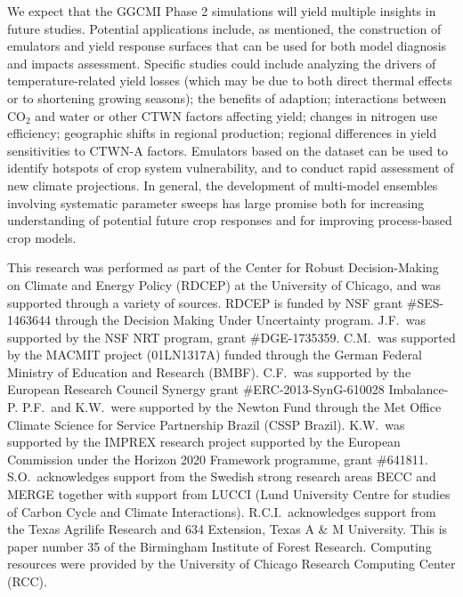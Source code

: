 \documentclass[gmd, manuscript]{copernicus} %
\begin{document}
We expect that the GGCMI Phase 2 simulations will yield multiple insights in future studies. 
Potential applications include, as mentioned, the construction of emulators and yield response surfaces that can be used for both model diagnosis and impacts assessment. Specific studies could include analyzing the drivers of temperature-related yield losses (which may be due to both direct thermal effects or to shortening growing seasons); the benefits of adaption; interactions between CO$_2$ and water or other CTWN factors affecting yield; changes in nitrogen use efficiency; geographic shifts in regional production; regional differences in yield sensitivities to CTWN-A factors. Emulators based on the dataset can be used to identify hotspots of crop system vulnerability, and to conduct rapid assessment of new climate projections.  In general, the development of multi-model ensembles involving systematic parameter sweeps has large promise both for increasing understanding of potential future crop responses and for improving process-based crop models.

\begin{acknowledgements}
    This research was performed as part of the Center for Robust 
    Decision-Making on Climate and Energy Policy (RDCEP) at the University 
    of Chicago, and was supported through a variety of sources.
    RDCEP is funded by NSF grant \#SES-1463644 through the Decision Making 
    Under Uncertainty program.
    J.F.\ was supported by the NSF NRT program, grant \#DGE-1735359.
    C.M.\ was supported by the MACMIT project (01LN1317A) funded through the 
    German Federal Ministry of Education and Research (BMBF).
    C.F.\ was supported by the European Research Council Synergy grant 
    \#ERC-2013-SynG-610028 Imbalance-P.
    P.F.\ and K.W.\ were supported  by the Newton Fund through the Met 
    Office Climate Science for Service Partnership Brazil (CSSP Brazil).
    K.W.\ was supported by the IMPREX research project supported by the 
    European Commission under the Horizon 2020 Framework programme, grant 
    \#641811.
    S.O.\ acknowledges support from the Swedish strong research areas BECC 
    and MERGE together with support from LUCCI (Lund University Centre for 
    studies of Carbon Cycle and Climate Interactions).
    R.C.I.\ acknowledges support from the Texas Agrilife Research and 634 
    Extension, Texas A \& M University.
    This is paper number 35 of the Birmingham Institute of Forest Research.
    Computing resources were provided by the University of Chicago Research 
    Computing Center (RCC).
    \end{acknowledgements}
    
\end{document}
